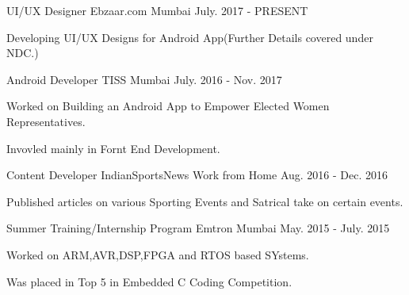 

\begin{cventries}

  \cventry
    {UI/UX Designer} %
    {Ebzaar.com} %
    {Mumbai} %
    {July. 2017 - PRESENT} %
    {
      \begin{cvitems} %
        \item {Developing UI/UX Designs for Android App(Further Details covered under NDC.)}
      \end{cvitems}
    }

  \cventry
    {Android Developer} %
    {TISS} %
    {Mumbai} %
    {July. 2016 - Nov. 2017} %
    {
      \begin{cvitems} %
        \item {Worked on Building an Android App to Empower Elected Women Representatives.}
        \item {Invovled mainly in Fornt End Development.}
      \end{cvitems}
    }

  \cventry
    {Content Developer} %
    {IndianSportsNews} %
    {Work from Home} %
    {Aug. 2016 - Dec. 2016} %
    {
      \begin{cvitems} %
        \item {Published articles on various Sporting Events and Satrical take on certain events.}
      \end{cvitems}
    }

  \cventry
    {Summer Training/Internship Program} %
    {Emtron} %
    {Mumbai} %
    {May. 2015 - July. 2015} %
    {
      \begin{cvitems} %
        \item {Worked on ARM,AVR,DSP,FPGA and RTOS based SYstems.}
        \item {Was placed in Top 5 in Embedded C Coding Competition.}
      \end{cvitems}
    }
\end{cventries}
